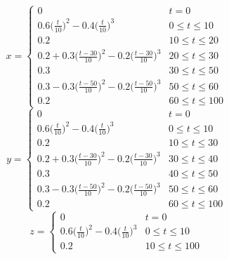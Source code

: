 \documentclass[letterpaper%
, twoside%
, 12pt%
,memoire%
, english%
,creativecommons,hyperref%
]{thETS}
\begin{document}
\begin{equation}\label{eqn:x_traj}
x=
\begin{cases} 
	  0 & t=0 \\
      0.6\big(\frac{t}{10}\big)^2 - 0.4\big(\frac{t}{10}\big)^3 & 0\leq t\leq 10 \\
      0.2 & 10\leq t\leq 20 \\
      0.2 + 0.3\big(\frac{t-30}{10}\big)^2 - 0.2\big(\frac{t-30}{10}\big)^3 & 20\leq t\leq 30 \\
      0.3 & 30\leq t\leq 50 \\
      0.3 - 0.3\big(\frac{t-50}{10}\big)^2 -  0.2\big(\frac{t-50}{10}\big)^3 & 50\leq t\leq 60 \\
      0.2 & 60\leq t\leq 100
\end{cases}
\end{equation}
\begin{equation}\label{eqn:y_traj}
y=
\begin{cases} 
	  0 & t=0 \\
      0.6\big(\frac{t}{10}\big)^2 - 0.4\big(\frac{t}{10}\big)^3 & 0\leq t\leq 10 \\
      0.2 & 10\leq t\leq 30 \\
      0.2 + 0.3\big(\frac{t-30}{10}\big)^2 - 0.2\big(\frac{t-30}{10}\big)^3 & 30\leq t\leq 40 \\
      0.3 & 40\leq t\leq 50 \\
      0.3 - 0.3\big(\frac{t-50}{10}\big)^2 -  0.2\big(\frac{t-50}{10}\big)^3 & 50\leq t\leq 60 \\
      0.2 & 60\leq t\leq 100
\end{cases}
\end{equation}
\begin{equation}\label{eqn:z_traj}
z=
\begin{cases} 
	  0 & t=0 \\
      0.6\big(\frac{t}{10}\big)^2 - 0.4\big(\frac{t}{10}\big)^3 & 0\leq t\leq 10 \\
      0.2 & 10\leq t\leq 100
\end{cases}
\end{equation}
\end{document}
